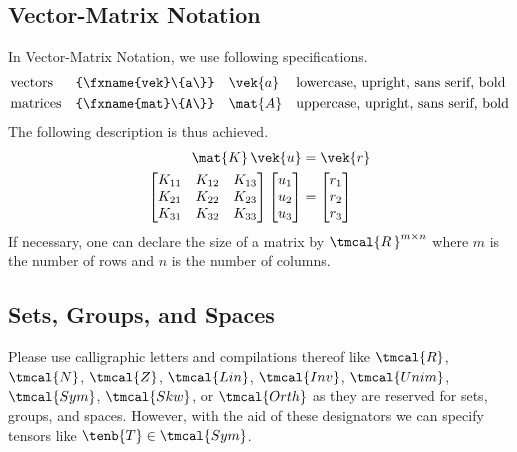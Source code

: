 \documentclass{techmech}
\begin{document}
\subsection{Vector-Matrix Notation}
In Vector-Matrix Notation, we use following specifications.
\begin{equation*}
\begin{aligned}
&\text{vectors} &&\verb|\vek{a}|              && \vek{a}&& \text{lowercase, upright, sans serif, bold}\\
&\text{matrices} &&\verb|\mat{A}| &&\mat{A}&& \text{uppercase, upright, sans serif, bold}\\
\end{aligned}
\end{equation*}
The following description is thus achieved.
\begin{align}
\mat{K}\,\vek{u}&=\vek{r}\\
\begin{bmatrix}
K_{11} &        K_{12}  & K_{13}\\
K_{21} &        K_{22}  & K_{23}\\
K_{31} &        K_{32}  & K_{33}\\
\end{bmatrix}
\begin{bmatrix}
u_1\\
u_2\\
u_3
\end{bmatrix}
&=
\begin{bmatrix}
r_1\\
r_2\\
r_3
\end{bmatrix}
\end{align}
If necessary, one can declare the size of a matrix by $\tmcal{R\,}^{m\times n}$ where $m$ is the number of rows and $n$ is the number of columns.
\subsection{Sets, Groups, and Spaces}
Please use calligraphic letters and compilations thereof like $\tmcal{R}$, $\tmcal{N}$, $\tmcal{Z}$, $\tmcal{Lin}$, $\tmcal{Inv}$, $\tmcal{Unim}$, $\tmcal{Sym}$, $\tmcal{Skw}$,  or $\tmcal{Orth}$ as they are reserved for sets, groups, and spaces. However, with the aid of these designators we can specify tensors like $\tenb{T}\in\tmcal{Sym}$.

\end{document}
